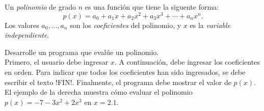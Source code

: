 Un \emph{polinomio} de grado \(n\)
es una función que tiene la siguente forma:
\[
  p(x) =
  a_0     +
  a_1 x   +
  a_2 x^2 +
  a_3 x^3 +
  \cdots +
  a_n x^n.
\]
Los valores \(a_0, \ldots, a_n\)
son los \emph{coeficientes} del polinomio,
y \(x\) es la \emph{variable independiente}.

\begin{minipage}[t]{.63\textwidth}
  Desarrolle un programa
  que evalúe un polinomio.
  \\[1ex]
  Primero,
  el usuario debe ingresar \(x\).
  A continuación,
  debe ingresar los coeficientes en orden.
  Para indicar que todos los coeficientes han sido ingresados,
  se debe escribir el texto \li!FIN!.
  Finalmente,
  el programa debe mostrar
  el valor de \(p(x)\).
  \\[1ex]
  El ejemplo de la derecha
  muestra cómo evaluar el polinomio
  \(p(x) = -7 - 3x^2 + 2x^3\) en \(x = 2.1\).
\end{minipage}
\hfill
\begin{minipage}[t]{.26\textwidth}
  
\end{minipage}


